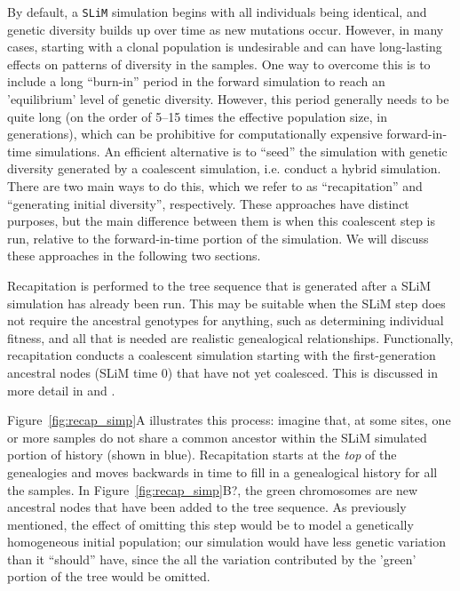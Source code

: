 \documentclass[12pt]{article}
\newcommand{\slim}[0]{\texttt{SLiM}\xspace}
\begin{document}
By default, a \slim simulation begins with all individuals being identical, and genetic diversity
builds up over time as new mutations occur. However, in many cases, starting with a clonal population
is undesirable and can have long-lasting effects on patterns of diversity in the samples. One way to overcome
this is to include a long ``burn-in'' period in the forward simulation to reach an 'equilibrium' level of genetic diversity.
However, this period generally needs to be quite long (on the order of 5--15 times the effective population size, in generations),
which can be prohibitive for computationally expensive forward-in-time simulations.
An efficient alternative is to ``seed'' the simulation with genetic diversity generated by a coalescent simulation, i.e. conduct a hybrid simulation.
There are two main ways to do this, which we refer to as ``recapitation'' and ``generating initial diversity'', respectively.
These approaches have distinct purposes, but the main difference between them is when
this coalescent step is run, relative to the forward-in-time portion of the simulation. We will discuss these approaches in the following two sections.

Recapitation is performed to the tree sequence that is generated after a SLiM simulation has already been run.
This may be suitable when the SLiM step does not require the ancestral genotypes for anything, such as determining individual fitness,
and all that is needed are realistic genealogical relationships. Functionally, recapitation conducts a coalescent simulation
starting with the first-generation ancestral nodes (SLiM time 0) that have not yet coalesced.
This is discussed in more detail in \citet{baumdicker_efficient_2022} and \citet{haller2016slim}.

Figure~\ref{fig:recap_simp}A illustrates this process: imagine that, at some sites, one or more samples do not share
a common ancestor within the SLiM simulated portion of history (shown in blue).
Recapitation starts at the \textit{top} of the genealogies and moves backwards in time
to fill in a genealogical history for all the samples.
In Figure~\ref{fig:recap_simp}B?, the green chromosomes are new ancestral nodes that have been added to the tree sequence.
As previously mentioned, the effect of omitting this step would be to model a genetically homogeneous initial population;
our simulation would have less genetic variation than it ``should'' have, since the all the variation
contributed by the 'green' portion of the tree would be omitted.
\end{document}
